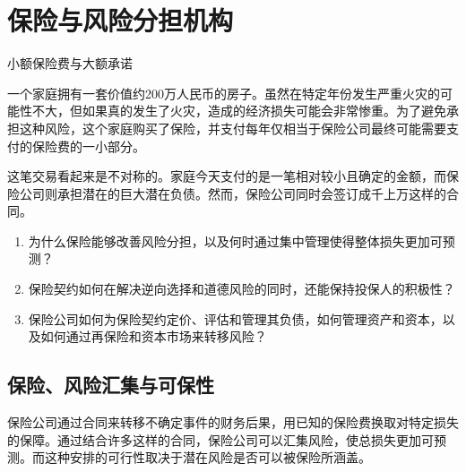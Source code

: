 \chapter{保险与风险分担机构}
\label{chap:Insurance_and_Risk_Sharing_Institutions}


\begin{openingcase}{小额保险费与大额承诺}

一个家庭拥有一套价值约200万人民币的房子。虽然在特定年份发生严重火灾的可能性不大，但如果真的发生了火灾，造成的经济损失可能会非常惨重。为了避免承担这种风险，这个家庭购买了保险，并支付每年仅相当于保险公司最终可能需要支付的保险费的一小部分。

这笔交易看起来是不对称的。家庭今天支付的是一笔相对较小且确定的金额，而保险公司则承担潜在的巨大潜在负债。然而，保险公司同时会签订成千上万这样的合同。

\end{openingcase}

\begin{tcolorbox}[
  enhanced,
  colback=FinanceBlue!6,
  colframe=FinanceBlue,
  boxrule=0.6pt,
  sharp corners,
  left=8pt,
  right=8pt,
  top=7pt,
  bottom=7pt,
  before skip=1em,
  after skip=1.6em,
  title=\textbf{核心问题},
  coltitle=white,
  colbacktitle=FinanceBlue,
  fonttitle=\bfseries,
  attach boxed title to top left={xshift=6pt,yshift=-2mm},
  boxed title style={
    boxrule=0pt,
    sharp corners,
    left=5pt,
    right=5pt,
    top=2pt,
    bottom=2pt
  }
]
\begin{enumerate}[
  leftmargin=*,
  label=\textcolor{FinanceBlue}{\textbf{\arabic*.}},
  itemsep=0.55em,
  topsep=0.2em
]


\item 为什么保险能够改善风险分担，以及何时通过集中管理使得整体损失更加可预测？

\item 保险契约如何在解决逆向选择和道德风险的同时，还能保持投保人的积极性？

\item 保险公司如何为保险契约定价、评估和管理其负债，如何管理资产和资本，以及如何通过再保险和资本市场来转移风险？

\end{enumerate}
\end{tcolorbox}

\section{保险、风险汇集与可保性}

保险公司通过合同来转移不确定事件的财务后果，用已知的保险费换取对特定损失的保障。通过结合许多这样的合同，保险公司可以汇集风险，使总损失更加可预测。而这种安排的可行性取决于潜在风险是否可以被保险所涵盖。

